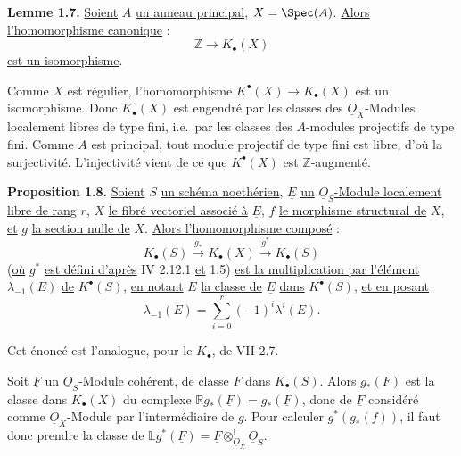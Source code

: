 
\textbf{Lemme 1.7.} \uline{Soient} $A$ \uline{un anneau principal}, $X=\Spec(A)$. \uline{Alors l'homomorphisme canonique} :
\[
\mathbb Z\longrightarrow K_\bullet(X)
\]
\uline{est un isomorphisme}.

Comme $X$ est régulier, l'homomorphisme $K^{\bullet}(X)\to K_\bullet(X)$ est un isomorphisme. Donc $K_\bullet(X)$ est engendré par les classes des $\underline{O}_X$-Modules localement libres de type fini, i.e.\ par les classes des $A$-modules projectifs de type fini. Comme $A$ est principal, tout module projectif de type fini est libre, d'où la surjectivité. L'injectivité vient de ce que $K^{\bullet}(X)$ est $\mathbb Z$-augmenté.

\textbf{Proposition 1.8.} \uline{Soient} $S$ \uline{un schéma noethérien}, $\underline{E}$ \uline{un} $\underline{O}_S$\uline{-Module localement libre de rang} $r$, $X$ \uline{le fibré vectoriel associé à} $\underline{E}$, $f$ \uline{le morphisme structural de} $X$, \uline{et} $g$ \uline{la section nulle de} $X$. \uline{Alors l'homomorphisme composé} :
\[
K_\bullet(S)\xrightarrow{g_*}K_\bullet(X)\xrightarrow{g^*}K_\bullet(S)
\]
(\uline{où} $g^*$ \uline{est défini d'après} IV 2.12.1 \uline{et} 1.5) \uline{est la multiplication par l'élément} $\lambda_{-1}(E)$ \uline{de} $K^{\bullet}(S)$, \uline{en notant} $E$ \uline{la classe de} $\underline{E}$ \uline{dans} $K^{\bullet}(S)$, \uline{et en posant}
\[
\lambda_{-1}(E)=\sum_{i=0}^r(-1)^i\lambda^i(E).
\]

Cet énoncé est l'analogue, pour le $K_\bullet$, de VII 2.7.

Soit $\underline{F}$ un $\underline{O}_S$-Module cohérent, de classe $F$ dans $K_\bullet(S)$. Alors $g_*(F)$ est la classe dans $K_\bullet(X)$ du complexe $\mathbb Rg_*(\underline{F})=g_*(\underline{F})$, donc de $\underline{F}$ considéré comme $\underline{O}_X$-Module par l'intermédiaire de $g$. Pour calculer $g^*(g_*(f))$, il faut donc prendre la classe de \(\mathbb Lg^*(\underline{F})=\underline{F}\otimes^{\mathbb L}_{\underline{O}_X}\underline{O}_S\).


